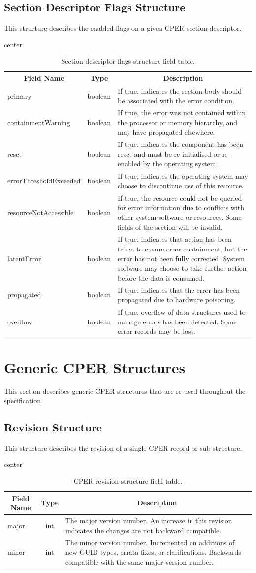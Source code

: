 \documentclass{report}
\newcommand*{\thead}[1]{\multicolumn{1}{|c|}{\bfseries #1}}
\newcommand*{\jsontable}[1]{
    \begin{table}[!ht]
    \label{#1}
    \centering
    \begin{adjustbox}{center}
    \begin{tabular}{|l|c|p{8cm}|}
    \hline
    \thead{Field Name} & \thead{Type} & \thead{Description} \\
    \hline
}
\newcommand*{\jsontableend}[1]{
    \hline
    \end{tabular}
    \end{adjustbox}
    \caption{#1}
    \label{table:#1}
    \end{table}
    \FloatBarrier
}
\begin{document}
\subsection{Section Descriptor Flags Structure}
\label{subsection:sectiondescriptorflagsstructure}
This structure describes the enabled flags on a given CPER section descriptor.
\jsontable{table:sectiondescriptorflagsstructure}
primary & boolean & If true, indicates the section body should be associated with the error condition.\\
\hline
containmentWarning & boolean & If true, the error was not contained within the processor or memory hierarchy, and may have propagated elsewhere.\\
\hline
reset & boolean & If true, indicates the component has been reset and must be re-initialised or re-enabled by the operating system.\\
\hline
errorThresholdExceeded & boolean & If true, indicates the operating system may choose to discontinue use of this resource.\\
\hline
resourceNotAccessible & boolean & If true, the resource could not be queried for error information due to conflicts with other system software or resources. Some fields of the section will be invalid.\\
\hline
latentError & boolean & If true, indicates that action has been taken to ensure error containment, but the error has not been fully corrected. System software may choose to take further action before the data is consumed.\\
\hline
propagated & boolean & If true, indicates that the error has been propagated due to hardware poisoning.\\
\hline
overflow & boolean & If true, overflow of data structures used to manage errors has been detected. Some error records may be lost.\\
\jsontableend{Section descriptor flags structure field table.}

\section{Generic CPER Structures}
This section describes generic CPER structures that are re-used throughout the specification.

\subsection{Revision Structure}
\label{subsection:revisionstructure}
This structure describes the revision of a single CPER record or sub-structure.
\jsontable{table:revisionstructure}
major & int & The major version number. An increase in this revision indicates the changes are not backward compatible. \\
\hline
minor & int & The minor version number. Incremented on additions of new GUID types, errata fixes, or clarifications. Backwards compatible with the same major version number. \\
\jsontableend{CPER revision structure field table.}
\end{document}
